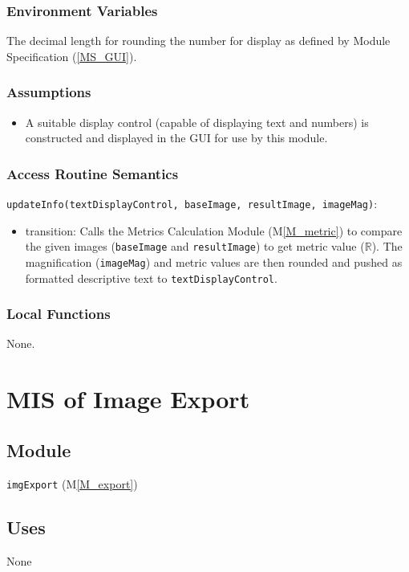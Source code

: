\documentclass[12pt, titlepage]{article}
\newcommand{\mref}[1]{M\ref{#1}}
\newcommand{\mrefp}[1]{(\mref{#1})}
\newcommand{\mreff}[1]{Module \mrefp{#1}}
\newcommand{\msref}[1]{Module Specification (\ref{#1})}
\newcommand{\code}[1]{\texttt{#1}}
\begin{document}
\subsubsection{Environment Variables}
The decimal length for rounding the number for display as defined by \msref{MS_GUI}.

\subsubsection{Assumptions}
\begin{itemize}
  \item A suitable display control (capable of displaying text and numbers) is constructed
  and displayed in the GUI for use by this module.
\end{itemize}

\subsubsection{Access Routine Semantics}

\noindent \code{updateInfo(textDisplayControl, baseImage, resultImage, imageMag)}:
\begin{itemize}
\item transition: Calls the Metrics Calculation \mreff{M_metric} to compare the given images
  (\code{baseImage} and \code{resultImage}) to get metric value ($\mathbb{R}$).
  The magnification (\code{imageMag}) and metric values are then rounded 
  and pushed as formatted descriptive text to \code{textDisplayControl}.
\end{itemize}

\subsubsection{Local Functions}
None.

\newpage



\section{MIS of Image Export} \label{MS_ImageExport}

\subsection{Module}
\code{imgExport} \mrefp{M_export}

\subsection{Uses}
None
\end{document}
